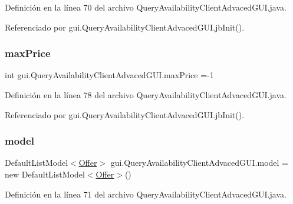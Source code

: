 Definición en la línea 70 del archivo Query\+Availability\+Client\+Advaced\+G\+U\+I.\+java.



Referenciado por gui.\+Query\+Availability\+Client\+Advaced\+G\+U\+I.\+jb\+Init().

\mbox{\label{classgui_1_1_query_availability_client_advaced_g_u_i_a518ac2fa95f208a8c9cda2c90b3503d4}} 
\subsubsection{\texorpdfstring{maxPrice}{maxPrice}}
{\footnotesize\ttfamily int gui.\+Query\+Availability\+Client\+Advaced\+G\+U\+I.\+max\+Price =-\/1\hspace{0.3cm}{\ttfamily [private]}}



Definición en la línea 78 del archivo Query\+Availability\+Client\+Advaced\+G\+U\+I.\+java.



Referenciado por gui.\+Query\+Availability\+Client\+Advaced\+G\+U\+I.\+jb\+Init().

\mbox{\label{classgui_1_1_query_availability_client_advaced_g_u_i_a4f921e1a8cb3a5ebf9c3093cc8344932}} 
\subsubsection{\texorpdfstring{model}{model}}
{\footnotesize\ttfamily Default\+List\+Model$<$\mbox{\hyperlink{classdomain_1_1_offer}{Offer}}$>$ gui.\+Query\+Availability\+Client\+Advaced\+G\+U\+I.\+model = new Default\+List\+Model$<$\mbox{\hyperlink{classdomain_1_1_offer}{Offer}}$>$()\hspace{0.3cm}{\ttfamily [private]}}



Definición en la línea 71 del archivo Query\+Availability\+Client\+Advaced\+G\+U\+I.\+java.



